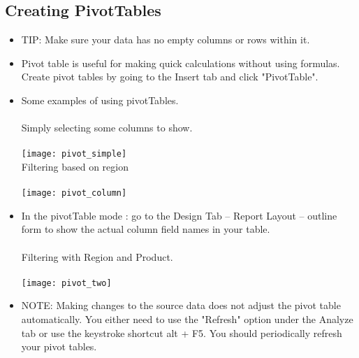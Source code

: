 \documentclass[11pt, oneside]{article}   	%
\begin{document}
\subsection{Creating PivotTables}
\begin{itemize}
\item TIP: Make sure your data has no empty columns or rows within it.
\item Pivot table is useful for making quick calculations without using formulas. Create pivot tables by going to the Insert tab and click "PivotTable".
\item Some examples of using pivotTables. \\
\bigskip \\
Simply selecting some columns to show. \\
\bigskip \\
\texttt{[image: pivot\_simple]}
\bigskip \\
Filtering based on region \\
\bigskip \\
\texttt{[image: pivot\_column]}
\bigskip\\
\item In the pivotTable mode : go to the Design Tab -- Report Layout -- outline form to show the actual column field names in your table. \\
\bigskip \\
Filtering with Region and Product. \\
\bigskip\\
\texttt{[image: pivot\_two]}
\bigskip\\
\item NOTE: Making changes to the source data does not adjust the pivot table automatically. You either need to use the "Refresh" option under the Analyze tab or use the keystroke shortcut alt + F5. You should periodically refresh your pivot tables.
\end{itemize}
\end{document}
